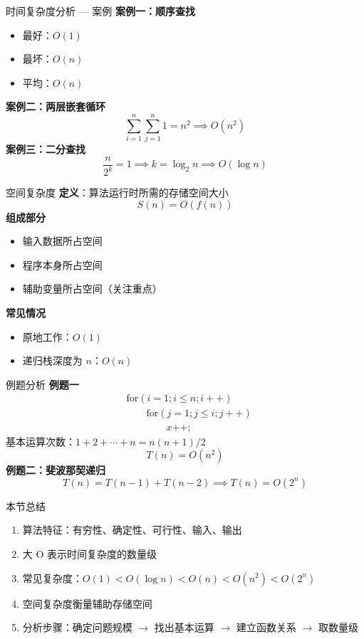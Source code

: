 \documentclass[10pt, aspectratio=169]{beamer}
\begin{document}
\begin{frame}{时间复杂度分析 --- 案例}
    \textbf{案例一：顺序查找}
    \begin{itemize}
        \item 最好：$O(1)$
        \item 最坏：$O(n)$
        \item 平均：$O(n)$
    \end{itemize}
    \vspace{0.5em}
    \textbf{案例二：两层嵌套循环}
    \[
    \sum_{i=1}^{n}\sum_{j=1}^{n} 1 = n^2 \implies O(n^2)
    \]
    \vspace{0.5em}
    \textbf{案例三：二分查找}
    \[
    \frac{n}{2^k} = 1 \implies k = \log_2 n \implies O(\log n)
    \]
\end{frame}

\begin{frame}{空间复杂度}
    \textbf{定义}：算法运行时所需的存储空间大小
    \[
    S(n) = O(f(n))
    \]
    \vspace{0.5em}
    \textbf{组成部分}
    \begin{itemize}
        \item 输入数据所占空间
        \item 程序本身所占空间
        \item 辅助变量所占空间（关注重点）
    \end{itemize}
    \vspace{0.5em}
    \textbf{常见情况}
    \begin{itemize}
        \item 原地工作：$O(1)$
        \item 递归栈深度为 $n$：$O(n)$
    \end{itemize}
\end{frame}

\begin{frame}{例题分析}
    \textbf{例题一}
    \[
    \begin{aligned}
    &\text{for}(i = 1; i \le n; i++) \\
    &\qquad \text{for}(j = 1; j \le i; j++) \\
    &\qquad \qquad x\text{++};
    \end{aligned}
    \]
    基本运算次数：$1 + 2 + \cdots + n = n(n+1)/2$
    \[
    T(n) = O(n^2)
    \]
    \vspace{0.5em}
    \textbf{例题二：斐波那契递归}
    \[
    T(n) = T(n-1) + T(n-2) \implies T(n) = O(2^n)
    \]
\end{frame}

\begin{frame}{本节总结}
    \begin{enumerate}
        \item 算法特征：有穷性、确定性、可行性、输入、输出
        \item 大 O 表示时间复杂度的数量级
        \item 常见复杂度：$O(1) < O(\log n) < O(n) < O(n^2) < O(2^n)$
        \item 空间复杂度衡量辅助存储空间
        \item 分析步骤：确定问题规模 $\to$ 找出基本运算 $\to$ 建立函数关系 $\to$ 取数量级
    \end{enumerate}
\end{frame}
\end{document}
